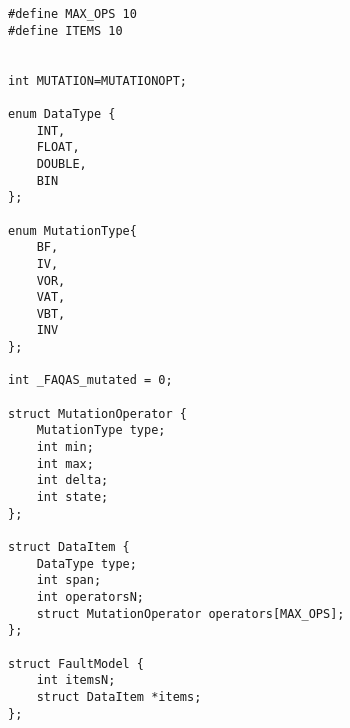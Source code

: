 
\begin{minipage}{15cm}
\begin{lstlisting}[style=CStyle, caption=Fault model data structures., label=faultModelStructure, mathescape=true]
#define MAX_OPS 10
#define ITEMS 10


int MUTATION=MUTATIONOPT;

enum DataType {
    INT,
    FLOAT,
    DOUBLE,
    BIN
};

enum MutationType{
    BF,
    IV,
    VOR,
    VAT,
    VBT,
    INV
};

int _FAQAS_mutated = 0;

struct MutationOperator {
    MutationType type;
    int min;
    int max;
    int delta;
    int state;
};

struct DataItem {
    DataType type;
    int span;
    int operatorsN;
    struct MutationOperator operators[MAX_OPS];
};

struct FaultModel {
    int itemsN;
    struct DataItem *items;
};

\end{lstlisting}
\end{minipage}

